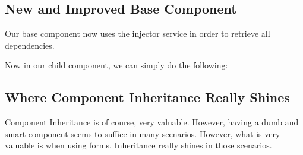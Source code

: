 \subsection{ New and Improved Base Component }
Our base component now uses the injector service in order to retrieve all
dependencies.


Now in our child component, we can simply do the following:



\subsection{ Where Component Inheritance Really Shines }
Component Inheritance is of course, very valuable. However, having a dumb and
smart component seems to suffice in many scenarios. However, what is very
valuable is when using forms. Inheritance really shines in those scenarios. 
